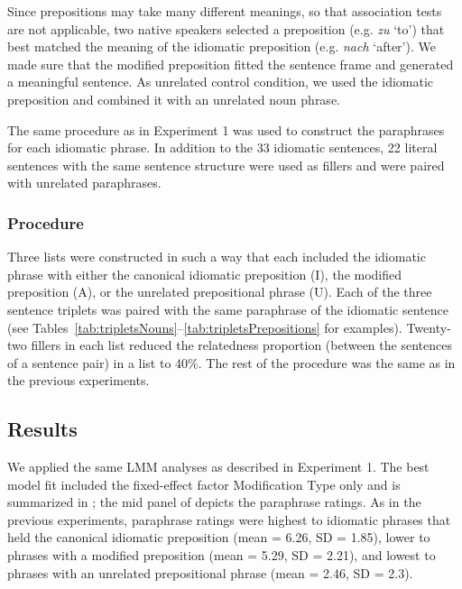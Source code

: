 \documentclass[output=paper]{langsci/langscibook}
\begin{document}
Since prepositions may take many different meanings, so that association tests are not applicable, two native speakers selected a preposition (e.g. \textit{zu} ‘to’) that best matched the meaning of the idiomatic preposition (e.g. \textit{nach} ‘after’). We made sure that the modified preposition fitted the sentence frame and generated a meaningful sentence. As unrelated control condition, we used the idiomatic preposition and combined it with an unrelated noun phrase. 

The same procedure as in Experiment 1 was used to construct the paraphrases for each idiomatic phrase. In addition to the 33 idiomatic sentences, 22 literal sentences with the same sentence structure were used as fillers and were paired with unrelated paraphrases.

\subsubsection{Procedure}

Three lists were constructed in such a way that each included the idiomatic phrase with either the canonical idiomatic preposition (I), the modified preposition (A), or the unrelated prepositional phrase (U). Each of the three sentence triplets was paired with the same paraphrase of the idiomatic sentence (see Tables~\ref{tab:tripletsNouns}--\ref{tab:tripletsPrepositions} for examples). Twenty-two fillers in each list reduced the relatedness proportion (between the sentences of a sentence pair) in a list to 40\%. The rest of the procedure was the same as in the previous experiments. 

\subsection{Results}

We applied the same LMM analyses as described in Experiment 1. The best model fit included the fixed-effect factor Modification Type only and is summarized in ; the mid panel of  depicts the paraphrase ratings. As in the previous experiments, paraphrase ratings were highest to idiomatic phrases that held the canonical idiomatic preposition (mean = 6.26, SD = 1.85), lower to phrases with a modified preposition (mean = 5.29, SD = 2.21), and lowest to phrases with an unrelated prepositional phrase (mean = 2.46, SD = 2.3).
\end{document}
